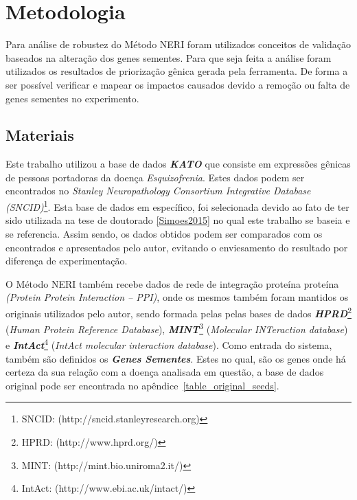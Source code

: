 \chapter[Metodologia]{Metodologia}




% 



%
Para análise de robustez do Método NERI foram utilizados conceitos de validação baseados na alteração dos genes sementes. Para que seja feita a análise foram utilizados os resultados de priorização gênica gerada pela ferramenta. De forma a ser possível verificar e mapear os impactos causados devido a remoção ou falta de genes sementes no experimento. 

\section{Materiais}

%
Este trabalho utilizou a base de dados \textsl{\textbf{KATO}} que consiste em expressões gênicas de pessoas portadoras da doença \textsl{Esquizofrenia}.
Estes dados podem ser encontrados no \textsl{Stanley Neuropathology Consortium Integrative Database (SNCID)}\footnote{SNCID: (http://sncid.stanleyresearch.org)}.
Esta base de dados em específico, foi selecionada devido ao fato de ter sido utilizada na tese de doutorado \ref{Simoes2015} no qual este trabalho se baseia e se referencia.
Assim sendo, os dados obtidos podem ser comparados com os encontrados e apresentados pelo autor, evitando o enviesamento do resultado por diferença de experimentação.

%
O Método NERI também recebe dados de rede de integração proteína proteína \textsl{(Protein Protein Interaction – PPI)}, onde os mesmos também foram mantidos os originais utilizados pelo autor, sendo formada pelas pelas bases de dados \textsl{\textbf{HPRD}}\footnote{HPRD: (http://www.hprd.org/)} (\textsl{Human Protein Reference Database}), \textsl{\textbf{MINT}}\footnote{MINT: (http://mint.bio.uniroma2.it/)} (\textsl{Molecular INTeraction database}) e \textsl{\textbf{IntAct}}\footnote{IntAct: (http://www.ebi.ac.uk/intact/)} (\textsl{IntAct molecular interaction database}).
%
Como entrada do sistema, também são definidos os \textsl{\textbf{Genes Sementes}}. Estes no qual, são os genes onde há certeza da sua relação com a doença analisada em questão, a base de dados original pode ser encontrada no apêndice~\ref{table_original_seeds}.

